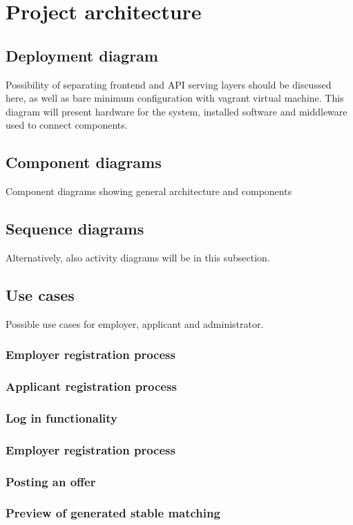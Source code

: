 \chapter{Project architecture}
\ifpdf
    \graphicspath{{Chapter2/Chapter2Figs/PNG/}{Chapter2/Chapter2Figs/PDF/}{Chapter2/Chapter2Figs/}}
\else
    \graphicspath{{Chapter2/Chapter2Figs/EPS/}{Chapter2/Chapter2Figs/}}
\fi

\section{Deployment diagram}

Possibility of separating frontend and API serving layers should be discussed here, as well as bare minimum configuration with vagrant virtual machine.
This diagram will present hardware for the system, installed software and middleware used to connect components.

\section{Component diagrams}
Component diagrams showing general architecture and components

\section{Sequence diagrams}
Alternatively, also activity diagrams will be in this subsection.

\section{Use cases}
Possible use cases for employer, applicant and administrator.

\subsection{Employer registration process}

\subsection{Applicant registration process}

\subsection{Log in functionality}

\subsection{Employer registration process}

\subsection{Posting an offer}

\subsection{Preview of generated stable matching}


